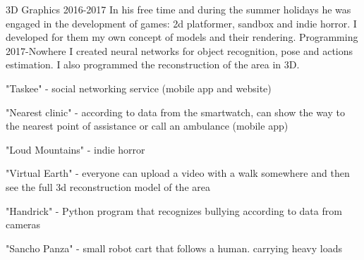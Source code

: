 \documentclass[11pt]{spidercv}
\begin{document}
    \begin{MainPart}

    \Experience
        {\ColorHighlight}
		{3D Graphics}
		{}
        {2016-2017\faUndo}
        {   
            In his free time and during the summer holidays he was engaged in the development of games: 2d platformer, sandbox and indie horror. I developed for them my own concept of models and their rendering.
        }
    \Experience
        {\ColorHighlight}
		{Programming}
		{}
        {2017-Nowhere}
        {   
            I created neural networks for object recognition, pose and actions estimation. I also programmed the reconstruction of the area in 3D.
        }

    
    \vspace*{0.5cm}
    \begin{DoubleColumns}
        \begin{ItemList}{\ColorHighlight}
            \item [] "Taskee" - social networking service (mobile app and website)
            \item [] "Nearest clinic" - according to data from the smartwatch, can show the way to the nearest point of assistance or call an ambulance (mobile app)
        \end{ItemList}
        \begin{ItemList}{\ColorHighlight}
            \item [] "Loud Mountains" - indie horror
            \item [] "Virtual Earth" - everyone can upload a video with a walk somewhere and then see the full 3d reconstruction model of the area
        \end{ItemList}
        \begin{ItemList}{\ColorHighlight}
            \item [] "Handrick" - Python program that recognizes bullying according to data from cameras
            \item [] "Sancho Panza" - small robot cart that follows a human. carrying heavy loads 
        \end{ItemList}
    \end{DoubleColumns}

    \end{MainPart}

    
\end{document}
